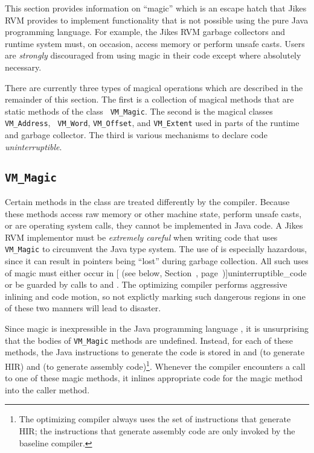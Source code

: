 This section provides information on ``magic'' which is an escape
hatch that Jikes\TMweb{} RVM provides to implement
functionality that is not 
possible using the pure Java\TMweb{} programming language.  For example, the Jikes RVM garbage
collectors and 
runtime system must, on occasion, access memory or perform unsafe
casts.  Users are {\it strongly} discouraged from using magic in their code
except where absolutely necessary.  

There are currently three types of magical operations which are
described in the remainder of this section.  The first is a collection
of magical methods that are static methods of the class {\tt
VM\_Magic}.  The second is the magical classes {\tt VM\_Address}, {\tt
VM\_Word}, {\tt VM\_Offset}, and  {\tt VM\_Extent} used in
parts of the runtime and garbage collector. The third is various
mechanisms to declare code {\em uninterruptible}.

\subsection{\texttt{VM\_Magic}}%
%
%
Certain methods in the class  are
treated differently by the compiler. Because these methods access raw
memory or other machine state, perform unsafe casts, or are operating
system calls, they cannot be implemented in Java code.  A
Jikes\TMweb{} RVM implementor must be {\em extremely careful} when
writing code that uses {\tt VM\_Magic} to circumvent the Java type
system.  The use of  is especially hazardous, since it can
result in pointers being ``lost'' during garbage collection.  All such
uses of magic must either occur in [
(see below, Section~\Ref, page~\Pageref)]{uninterruptible_code}
or be guarded by calls to  and .
The optimizing compiler performs aggressive inlining and code motion, so
not explictly marking such dangerous regions in one of these two
manners will lead to disaster.

Since magic is inexpressible in the Java programming language , it is
unsurprising that the bodies of {\tt VM\_Magic} methods are undefined.
Instead, for each of these methods, the Java instructions to generate
the code is stored in
 and 
 (to generate HIR) and 
 (to generate assembly code)\footnote{The optimizing
compiler always uses the set of instructions that generate HIR; the
instructions that generate assembly code are only invoked by the
baseline compiler.}.  Whenever the compiler encounters a call to one of these
magic methods, it inlines appropriate code for the magic method into the caller method.


